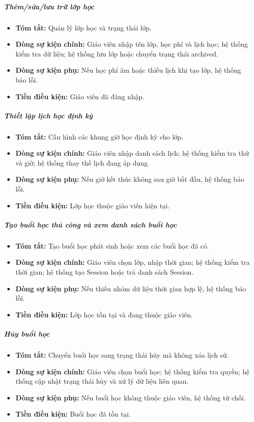 \documentclass[12pt,a4paper]{article}
\begin{document}
\subparagraph{Thêm/sửa/lưu trữ lớp học}
\begin{itemize}[leftmargin=*]
\item \textbf{Tóm tắt:} Quản lý lớp học và trạng thái lớp.
\item \textbf{Dòng sự kiện chính:} Giáo viên nhập tên lớp, học phí và lịch học; hệ thống kiểm tra dữ liệu; hệ thống lưu lớp hoặc chuyển trạng thái archived.
\item \textbf{Dòng sự kiện phụ:} Nếu học phí âm hoặc thiếu lịch khi tạo lớp, hệ thống báo lỗi.
\item \textbf{Tiền điều kiện:} Giáo viên đã đăng nhập.
\end{itemize}

\subparagraph{Thiết lập lịch học định kỳ}
\begin{itemize}[leftmargin=*]
\item \textbf{Tóm tắt:} Cấu hình các khung giờ học định kỳ cho lớp.
\item \textbf{Dòng sự kiện chính:} Giáo viên nhập danh sách lịch; hệ thống kiểm tra thứ và giờ; hệ thống thay thế lịch đang áp dụng.
\item \textbf{Dòng sự kiện phụ:} Nếu giờ kết thúc không sau giờ bắt đầu, hệ thống báo lỗi.
\item \textbf{Tiền điều kiện:} Lớp học thuộc giáo viên hiện tại.
\end{itemize}

\subparagraph{Tạo buổi học thủ công và xem danh sách buổi học}
\begin{itemize}[leftmargin=*]
\item \textbf{Tóm tắt:} Tạo buổi học phát sinh hoặc xem các buổi học đã có.
\item \textbf{Dòng sự kiện chính:} Giáo viên chọn lớp, nhập thời gian; hệ thống kiểm tra thời gian; hệ thống tạo Session hoặc trả danh sách Session.
\item \textbf{Dòng sự kiện phụ:} Nếu thiếu nhóm dữ liệu thời gian hợp lệ, hệ thống báo lỗi.
\item \textbf{Tiền điều kiện:} Lớp học tồn tại và đang thuộc giáo viên.
\end{itemize}

\subparagraph{Hủy buổi học}
\begin{itemize}[leftmargin=*]
\item \textbf{Tóm tắt:} Chuyển buổi học sang trạng thái hủy mà không xóa lịch sử.
\item \textbf{Dòng sự kiện chính:} Giáo viên chọn buổi học; hệ thống kiểm tra quyền; hệ thống cập nhật trạng thái hủy và xử lý dữ liệu liên quan.
\item \textbf{Dòng sự kiện phụ:} Nếu buổi học không thuộc giáo viên, hệ thống từ chối.
\item \textbf{Tiền điều kiện:} Buổi học đã tồn tại.
\end{itemize}
\end{document}
